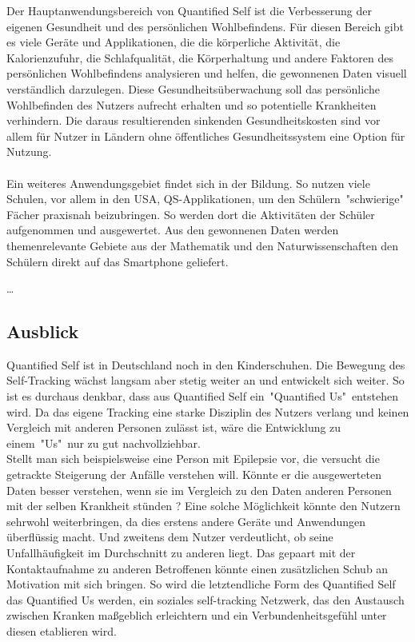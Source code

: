 Der Hauptanwendungsbereich von Quantified Self ist die Verbesserung der eigenen Gesundheit und des persönlichen Wohlbefindens. 
Für diesen Bereich gibt es viele Geräte und Applikationen, die die körperliche Aktivität, die Kalorienzufuhr, die Schlafqualität, die Körperhaltung und andere Faktoren des persönlichen Wohlbefindens analysieren und helfen, die gewonnenen Daten visuell verständlich darzulegen. 
Diese Gesundheitsüberwachung soll das persönliche Wohlbefinden des Nutzers aufrecht erhalten und so potentielle Krankheiten verhindern.
Die daraus resultierenden sinkenden Gesundheitskosten sind vor allem für Nutzer in Ländern ohne öffentliches Gesundheitssystem eine Option für Nutzung.
\\
\\
Ein weiteres Anwendungsgebiet findet sich in der Bildung. 
So nutzen viele Schulen, vor allem in den USA, QS-Applikationen, um den Schülern\ "schwierige" Fächer praxisnah beizubringen. 
So werden dort die Aktivitäten der Schüler aufgenommen und ausgewertet.
Aus den gewonnenen Daten werden themenrelevante Gebiete aus der Mathematik und den Naturwissenschaften den Schülern direkt auf das Smartphone geliefert. 

\ldots 


\subsection{Ausblick}
\label{ch:Grundlagen:sec:Quantified Self:subsec:Ausblick}

Quantified Self ist in Deutschland noch in den Kinderschuhen.
Die Bewegung des Self-Tracking wächst langsam aber stetig weiter an und entwickelt sich weiter.
So ist es durchaus denkbar, dass aus Quantified Self  ein\ "Quantified Us"\ entstehen wird.
Da das eigene Tracking eine starke Disziplin des Nutzers verlang und keinen Vergleich mit anderen Personen zulässt ist, wäre die Entwicklung zu einem\ "Us"\ nur zu gut nachvollziehbar.
\\
Stellt man sich beispielsweise eine Person mit Epilepsie vor, die versucht die getrackte Steigerung der Anfälle verstehen will. 
Könnte er die ausgewerteten Daten besser verstehen, wenn sie im Vergleich zu den Daten anderen Personen mit der selben Krankheit stünden ? 
Eine solche Möglichkeit könnte den Nutzern sehrwohl weiterbringen, da dies erstens andere Geräte und Anwendungen überflüssig macht. 
Und zweitens dem Nutzer verdeutlicht, ob seine Unfallhäufigkeit im Durchschnitt zu anderen liegt.
Das gepaart mit der Kontaktaufnahme zu anderen Betroffenen könnte einen zusätzlichen Schub an Motivation mit sich bringen. 
So wird die letztendliche Form des Quantified Self das Quantified Us werden, ein soziales self-tracking Netzwerk, das den Austausch zwischen Kranken maßgeblich erleichtern  und ein Verbundenheitsgefühl unter diesen etablieren wird.


